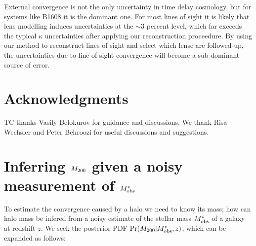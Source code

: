 \documentclass[useAMS,usenatbib]{mn2e}
\begin{document}
External convergence is not the only uncertainty in time delay cosmology,
but for systems like B1608 it is the dominant one. For most lines
of sight it is likely that lens modelling induces uncertainties at the
$\sim$3 percent level, which far exceeds the typical $\kappa$ uncertainties
after applying our reconstruction proceedure. By using our method to
reconstruct lines of sight and select which lense are followed-up, the
uncertainties due to line of sight convergence will become a sub-dominant 
source of error.


\section*{Acknowledgments}
 
TC thanks Vasily Belokurov for guidance and discussions.
We thank Risa Wechsler and Peter Behroozi for useful discussions and 
suggestions.



\appendix


\section{Inferring $M_{200}$ given a noisy measurement of $M^{*}_{\rm obs}$}
\label{appendix:MSMH}

To estimate the convergence caused by a halo we need to know its mass; how can 
halo mass be infered from a noisy estimate of the stellar mass $M^{*}_{\rm obs}$
of a galaxy at redshift $z$. We seek the posterior
PDF $\Pr(M_{200}|M^{*}_{\rm obs},z)$, which can be expanded as follows:
\end{document}
